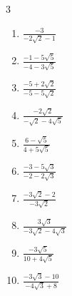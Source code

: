 \begin{multicols}{3}
\begin{enumerate}

  \item $\displaystyle \frac{-3}{-2\sqrt{2}-1}$


  \item $\displaystyle \frac{-1-5\sqrt{5}}{-4-3\sqrt{5}}$


  \item $\displaystyle \frac{-5+2\sqrt{2}}{-5-5\sqrt{2}}$


  \item $\displaystyle \frac{-2\sqrt{2}}{-\sqrt{2}-4\sqrt{5}}$


\columnbreak %

\resetques

  \item $\displaystyle \frac{6-\sqrt{5}}{4+5\sqrt{5}}$


  \item $\displaystyle \frac{-3-5\sqrt{3}}{-2-2\sqrt{3}}$


  \item $\displaystyle \frac{-3\sqrt{2}-2}{-3\sqrt{2}}$


  \item $\displaystyle \frac{3\sqrt{3}}{-3\sqrt{2}-4\sqrt{3}}$


  \item $\displaystyle \frac{-3\sqrt{5}}{10+4\sqrt{5}}$


\columnbreak %

  \item $\displaystyle \frac{-3\sqrt{3}-10}{-4\sqrt{3}+8}$



\end{enumerate}
\end{multicols}
